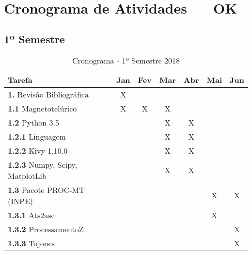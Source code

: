 
\chapter{Cronograma de Atividades \,\,\,\,\,\,\, OK}
    \label{cap-cronograma}
    
    
    \section{1º Semestre}
    
    \begin{table}[h]
    \caption{Cronograma - 1º Semestre 2018}
    
    \begin{center}
    \centering
    \begin{tabular}{|l||c|c|c|c|c|c|}
    
    \hline
    {\bf Tarefa}                   		& {\bf Jan}& {\bf Fev}& {\bf Mar}& {\bf Abr}& {\bf Mai}& {\bf Jun}\\  
    \hline
    {\bf 1.} Revisão Bibliográfica 		& 	X  & 	      & 	 & 	    & 	       & 	  \\ 
    \hline
    {\bf 1.1} Magnetotelúrico      		& 	X  & 	X     & X        & 	    & 	       & 	  \\ 
    \hline
    {\bf 1.2} Python 3.5           		& 	   &          & X	 &X 	    & 	       & 	  \\ 
    \hline
    {\bf 1.2.1} Linguagem           		& 	   & 	      & X	 &X 	    & 	       & 	  \\ 
    \hline
    {\bf 1.2.2} Kivy 1.10.0           		& 	   & 	      & X	 & X	    & 	       & 	  \\ 
    \hline
    {\bf 1.2.3} Numpy, Scipy, MatplotLib        & 	   & 	      & X	 & X	    & 	       & 	  \\ 
    \hline
    {\bf 1.3} Pacote PROC-MT (INPE)           	& 	   & 	      & 	 & 	    & X	       & X	  \\ 
    \hline
    {\bf 1.3.1} Ats2asc           		& 	   & 	      & 	 & 	    &X 	       & 	  \\ 
    \hline
    {\bf 1.3.2} ProcessamentoZ           	& 	   & 	      & 	 & 	    & 	       & X	  \\ 
    \hline
    {\bf 1.3.3} Tojones           		& 	   & 	      & 	 & 	    & 	       & X	  \\ 
    \hline
   
    
    
    \end{tabular}
 
   
    \end{center}

    \end{table}

